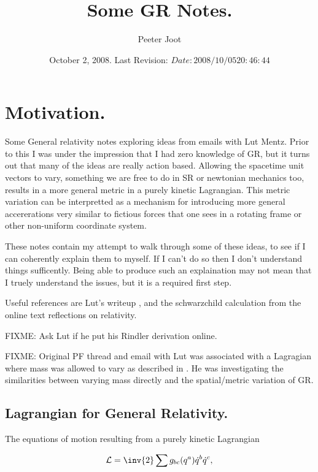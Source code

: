 \documentclass{article}      %
\title{ Some GR Notes. } %
\author{Peeter Joot}         %
\date{ October 2, 2008.  Last Revision: $Date: 2008/10/05 20:46:44 $ } %
\newcommand{\LL}[0]{\mathcal{L}}
\newcommand{\qdot}[0]{\dot{q}}
\begin{document}

\maketitle{}

\tableofcontents

\section{ Motivation. }

Some General relativity notes exploring ideas from emails with Lut Mentz.
Prior to this I was under the impression that I had zero knowledge of GR,
but it turns out that many of the ideas are really action based. 
Allowing the spacetime unit vectors to vary, something we are free to
do in SR or newtonian mechanics too, results in a more 
general metric in a purely kinetic Lagrangian.  This metric variation
can be interpretted as a mechanism for introducing more general
accererations very similar to fictious forces that one sees in a
rotating frame or other non-uniform coordinate system.

These notes contain my attempt to walk through some of these ideas, to see
if I can coherently explain them to myself.  If I can't do so then I don't
understand things sufficently.  Being able to produce such an explaination
may not mean that I truely understand the issues, but it is a required
first step.

Useful references are Lut's writeup \cite{lutSchwarzChildRadial}, 
and the schwarzchild calculation \cite{mathpagesSchwarzChildRadial}
from the online text reflections on relativity.

FIXME: Ask Lut if he put his Rindler derivation online.

FIXME: Original PF thread and email with Lut was associated with 
a Lagragian where mass was allowed to vary as described in \cite{PJMassVary}.  He was
investigating the similarities between varying mass directly and the spatial/metric
variation of GR.

\subsection{ Lagrangian for General Relativity. }

The equations of motion resulting from a purely kinetic Lagrangian

\begin{equation}\label{eqn:keLagrangian}
\LL = \inv{2} \sum  g_{b c}(q^a) \qdot^b \qdot^c,
\end{equation}
\end{document}
